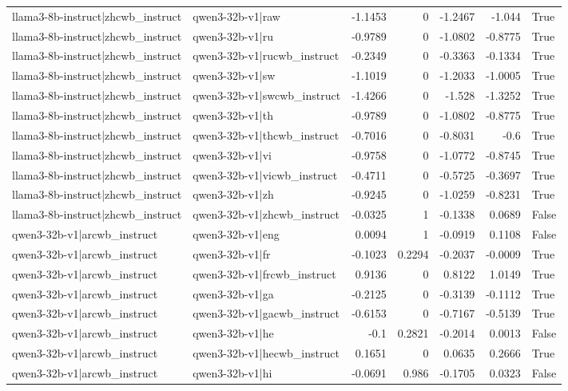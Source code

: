 \begin{table}
\begin{tabular}{l l r r r r l}
llama3-8b-instruct|zhcwb_instruct & qwen3-32b-v1|raw & -1.1453 & 0 & -1.2467 & -1.044 & True \\
llama3-8b-instruct|zhcwb_instruct & qwen3-32b-v1|ru & -0.9789 & 0 & -1.0802 & -0.8775 & True \\
llama3-8b-instruct|zhcwb_instruct & qwen3-32b-v1|rucwb_instruct & -0.2349 & 0 & -0.3363 & -0.1334 & True \\
llama3-8b-instruct|zhcwb_instruct & qwen3-32b-v1|sw & -1.1019 & 0 & -1.2033 & -1.0005 & True \\
llama3-8b-instruct|zhcwb_instruct & qwen3-32b-v1|swcwb_instruct & -1.4266 & 0 & -1.528 & -1.3252 & True \\
llama3-8b-instruct|zhcwb_instruct & qwen3-32b-v1|th & -0.9789 & 0 & -1.0802 & -0.8775 & True \\
llama3-8b-instruct|zhcwb_instruct & qwen3-32b-v1|thcwb_instruct & -0.7016 & 0 & -0.8031 & -0.6 & True \\
llama3-8b-instruct|zhcwb_instruct & qwen3-32b-v1|vi & -0.9758 & 0 & -1.0772 & -0.8745 & True \\
llama3-8b-instruct|zhcwb_instruct & qwen3-32b-v1|vicwb_instruct & -0.4711 & 0 & -0.5725 & -0.3697 & True \\
llama3-8b-instruct|zhcwb_instruct & qwen3-32b-v1|zh & -0.9245 & 0 & -1.0259 & -0.8231 & True \\
llama3-8b-instruct|zhcwb_instruct & qwen3-32b-v1|zhcwb_instruct & -0.0325 & 1 & -0.1338 & 0.0689 & False \\
qwen3-32b-v1|arcwb_instruct & qwen3-32b-v1|eng & 0.0094 & 1 & -0.0919 & 0.1108 & False \\
qwen3-32b-v1|arcwb_instruct & qwen3-32b-v1|fr & -0.1023 & 0.2294 & -0.2037 & -0.0009 & True \\
qwen3-32b-v1|arcwb_instruct & qwen3-32b-v1|frcwb_instruct & 0.9136 & 0 & 0.8122 & 1.0149 & True \\
qwen3-32b-v1|arcwb_instruct & qwen3-32b-v1|ga & -0.2125 & 0 & -0.3139 & -0.1112 & True \\
qwen3-32b-v1|arcwb_instruct & qwen3-32b-v1|gacwb_instruct & -0.6153 & 0 & -0.7167 & -0.5139 & True \\
qwen3-32b-v1|arcwb_instruct & qwen3-32b-v1|he & -0.1 & 0.2821 & -0.2014 & 0.0013 & False \\
qwen3-32b-v1|arcwb_instruct & qwen3-32b-v1|hecwb_instruct & 0.1651 & 0 & 0.0635 & 0.2666 & True \\
qwen3-32b-v1|arcwb_instruct & qwen3-32b-v1|hi & -0.0691 & 0.986 & -0.1705 & 0.0323 & False \\

\end{tabular}
\end{table}
